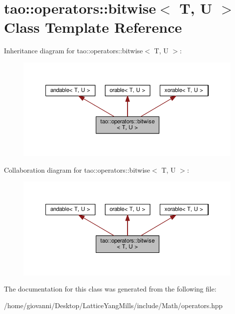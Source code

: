 \hypertarget{classtao_1_1operators_1_1bitwise}{}\section{tao\+:\+:operators\+:\+:bitwise$<$ T, U $>$ Class Template Reference}
\label{classtao_1_1operators_1_1bitwise}


Inheritance diagram for tao\+:\+:operators\+:\+:bitwise$<$ T, U $>$\+:\nopagebreak
\begin{figure}[H]
\begin{center}
\leavevmode
\includegraphics[width=350pt]{classtao_1_1operators_1_1bitwise__inherit__graph}
\end{center}
\end{figure}


Collaboration diagram for tao\+:\+:operators\+:\+:bitwise$<$ T, U $>$\+:\nopagebreak
\begin{figure}[H]
\begin{center}
\leavevmode
\includegraphics[width=350pt]{classtao_1_1operators_1_1bitwise__coll__graph}
\end{center}
\end{figure}


The documentation for this class was generated from the following file\+:\begin{DoxyCompactItemize}
\item 
/home/giovanni/\+Desktop/\+Lattice\+Yang\+Mills/include/\+Math/operators.\+hpp\end{DoxyCompactItemize}
